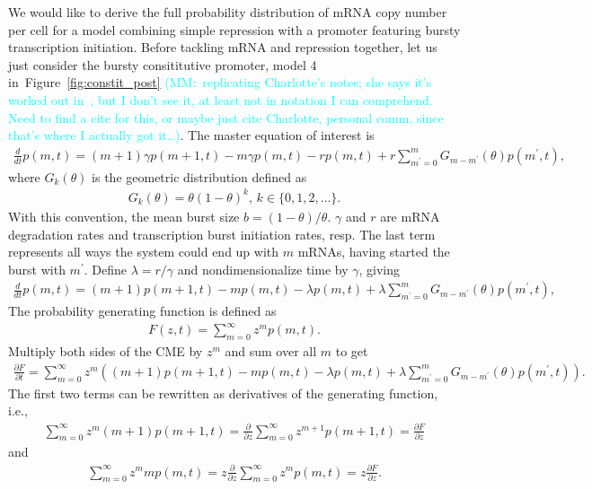 \documentclass[12pt]{article}%
\newcommand{\mmnote}[1]{\textcolor{cyan}{(MM:~#1)}}
\newcommand{\deriv}[2][{}]{\frac{d #1}{d #2}}
\newcommand{\pderiv}[2][{}]{\frac{\partial #1}{\partial #2}}
\newcommand{\fig}[1]{Figure~\ref{#1}}
\begin{document}
We would like to derive the full probability distribution of
mRNA copy number per cell for a model combining simple repression
with a promoter featuring bursty transcription initiation.
Before tackling mRNA and repression together, let us
just consider the bursty consititutive promoter,
model 4 in~\fig{fig:constit_post}
\mmnote{replicating Charlotte's notes; she says it's worked out
in~\cite{Paulsson2000}, but I don't see it, at least not in notation I can
comprehend. Need to find a cite for this,
or maybe just cite Charlotte, personal comm, since that's where I actually got it\dots}.
The master equation of interest is
\begin{align}
\deriv{t}p(m,t) = (m+1)\gamma p(m+1,t) - m\gamma p(m,t) - r p(m,t)
        + r \sum_{m^\prime=0}^m G_{m-m^\prime}(\theta) p(m^\prime,t),
\label{eq:1state_unreg_003}
\end{align}
where $G_{k}(\theta)$ is the geometric distribution defined as
\begin{align}
G_{k}(\theta) = \theta(1 - \theta)^k, \, k\in\{0,1,2,\dots\}.
\end{align}
With this convention, the mean burst size $b = (1-\theta)/\theta$.
$\gamma$ and $r$ are mRNA degradation rates and transcription burst
initiation rates, resp. The last term represents all ways the system could
end up with $m$ mRNAs, having started the burst with $m^\prime$. Define
$\lambda = r/\gamma$ and nondimensionalize time by $\gamma$, giving
\begin{align}
\deriv{t}p(m,t) = (m+1)p(m+1,t) - m p(m,t) - \lambda p(m,t)
        + \lambda \sum_{m^\prime=0}^m G_{m-m^\prime}(\theta) p(m^\prime,t),
\end{align}
The probability generating function is defined as
\begin{align}
F(z,t) = \sum_{m=0}^\infty z^m p(m,t).
\end{align}
Multiply both sides of the CME by $z^m$ and sum over all $m$ to get
\begin{align}
\pderiv[F]{t} = \sum_{m=0}^\infty z^m
\left(
(m+1)p(m+1,t) - m p(m,t) - \lambda p(m,t)
+ \lambda \sum_{m^\prime=0}^m G_{m-m^\prime}(\theta) p(m^\prime,t)
\right).
\end{align}
The first two terms can be rewritten as derivatives of the
generating function, i.e.,
\begin{align}
\sum_{m=0}^\infty z^m (m+1)p(m+1,t)
=
\pderiv{z} \sum_{m=0}^\infty z^{m+1} p(m+1,t)
=
\pderiv[F]{z}
\end{align}
and
\begin{align}
\sum_{m=0}^\infty z^m mp(m,t)
=
z\pderiv{z} \sum_{m=0}^\infty z^m p(m,t)
=
z\pderiv[F]{z}.
\end{align}
\end{document}
